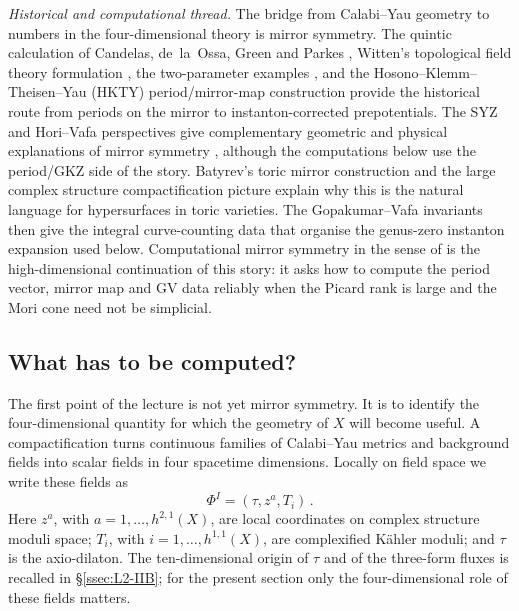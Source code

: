 \medskip
\noindent\textit{Historical and computational thread.}
The bridge from Calabi--Yau geometry to numbers in the
four-dimensional theory is mirror symmetry. The quintic calculation
of Candelas, de~la~Ossa, Green and Parkes
\cite{Candelas:1990rm}, Witten's topological field theory
formulation \cite{Witten:1991zz}, the two-parameter examples
\cite{Candelas:1993dm,Candelas:1994hw}, and the
Hosono--Klemm--Theisen--Yau (HKTY) period/mirror-map construction
\cite{Hosono:1993qy,HKTY2} provide the historical route from
periods on the mirror to instanton-corrected prepotentials.
The SYZ and Hori--Vafa perspectives give complementary geometric
and physical explanations of mirror symmetry
\cite{Strominger:1996it,Hori:2000kt,Hori:2003ic}, although the
computations below use the period/GKZ side of the story.
Batyrev's toric mirror construction \cite{Batyrev:1993oya} and the
large complex structure compactification picture
\cite{morrison1993compactifications} explain why this is the
natural language for hypersurfaces in toric varieties. The
Gopakumar--Vafa invariants \cite{Gopakumar:1998ii,Gopakumar:1998jq}
then give the integral curve-counting data that organise the
genus-zero instanton expansion used below. Computational mirror
symmetry in the sense of \cite{Demirtas:2023als} is the
high-dimensional continuation of this story: it asks how to compute
the period vector, mirror map and GV data reliably when the Picard
rank is large and the Mori cone need not be simplicial.





\subsection{What has to be computed?}\label{ssec:L2-computational-targets}

The first point of the lecture is not yet mirror symmetry.  It is to
identify the four-dimensional quantity for which the geometry of $X$
will become useful.  A compactification turns continuous families of
Calabi--Yau metrics and background fields into scalar fields in four
spacetime dimensions.  Locally on field space we write these fields as
\begin{equation}\label{eq:L2-field-content}
    \Phi^I=(\tau,z^a,T_i)\, .
\end{equation}
Here $z^a$, with $a=1,\ldots,h^{2,1}(X)$, are local coordinates on
complex structure moduli space; $T_i$, with
$i=1,\ldots,h^{1,1}(X)$, are complexified K\"ahler moduli; and
$\tau$ is the axio-dilaton.  The ten-dimensional origin of $\tau$ and of the
three-form fluxes is recalled in \S\ref{ssec:L2-IIB}; for the present
section only the four-dimensional role of these fields matters.

